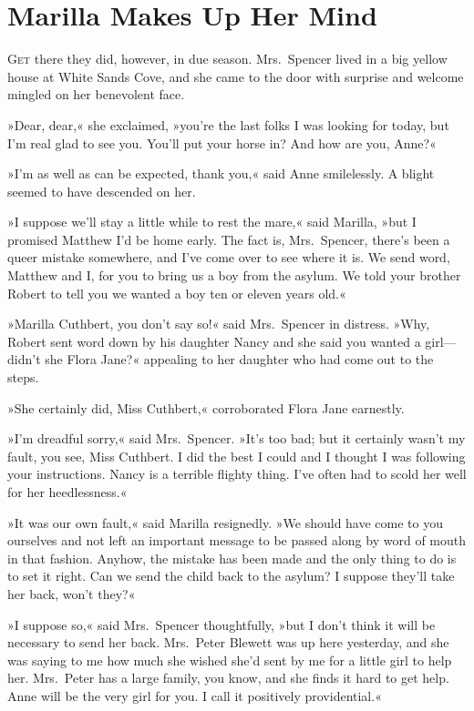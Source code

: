 \chapter{Marilla Makes Up Her Mind}

\lettrine[lines=4]{G}{et} there they did, however, in due season. Mrs.~Spencer lived in a big yellow house at White Sands Cove, and she came to the door with surprise and welcome mingled on her benevolent face.

\zz
»Dear, dear,« she exclaimed, »you're the last folks I was looking for today, but I'm real glad to see you. You'll put your horse in? And how are you, Anne?«

»I'm as well as can be expected, thank you,« said Anne smilelessly. A blight seemed to have descended on her.

»I suppose we'll stay a little while to rest the mare,« said Marilla, »but I promised Matthew I'd be home early. The fact is, Mrs.~Spencer, there's been a queer mistake somewhere, and I've come over to see where it is. We send word, Matthew and I, for you to bring us a boy from the asylum. We told your brother Robert to tell you we wanted a boy ten or eleven years old.«

»Marilla Cuthbert, you don't say so!« said Mrs.~Spencer in distress. »Why, Robert sent word down by his daughter Nancy and she said you wanted a girl—didn't she Flora Jane?« appealing to her daughter who had come out to the steps.

»She certainly did, Miss Cuthbert,« corroborated Flora Jane earnestly.

»I'm dreadful sorry,« said Mrs.~Spencer. »It's too bad; but it certainly wasn't my fault, you see, Miss Cuthbert. I did the best I could and I thought I was following your instructions. Nancy is a terrible flighty thing. I've often had to scold her well for her heedlessness.«

»It was our own fault,« said Marilla resignedly. »We should have come to you ourselves and not left an important message to be passed along by word of mouth in that fashion. Anyhow, the mistake has been made and the only thing to do is to set it right. Can we send the child back to the asylum? I suppose they'll take her back, won't they?«

»I suppose so,« said Mrs.~Spencer thoughtfully, »but I don't think it will be necessary to send her back. Mrs.~Peter Blewett was up here yesterday, and she was saying to me how much she wished she'd sent by me for a little girl to help her. Mrs.~Peter has a large family, you know, and she finds it hard to get help. Anne will be the very girl for you. I call it positively providential.«

